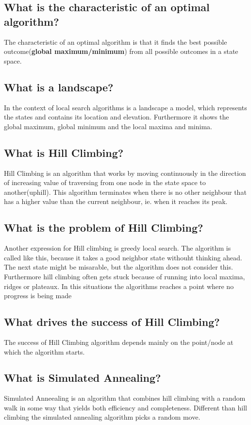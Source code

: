 \documentclass[11pt]{article}
\begin{document}
\subsection{What is the characteristic of an optimal algorithm?}
The characteristic of an optimal algorithm is that it finds the best possible outcome(\textbf{global maximum/minimum}) from all possible outcomes in a state space.

\subsection{What is a landscape?}
In the context of local search algorithms is a landscape a model, which represents the states and contains its location and elevation. Furthermore it shows the global maximum, global minimum and the local maxima and minima. 

\subsection{What is Hill Climbing?}
Hill Climbing is an algorithm that works by moving continuously in the direction of increasing value of traversing from one node in the state space to another(uphill). This algorithm terminates when there is no other neighbour that has a higher value than the current neighbour, ie. when it reaches its peak.

\subsection{What is the problem of Hill Climbing?}
Another expression for Hill climbing is greedy local search. The algorithm is called like this, because it takes a good neighbor state withouht thinking ahead. The next state might be misarable, but the algorithm does not consider this. Furthermore hill climbing often gets stuck because of running into local maxima, ridges or plateaux. In this situations the algorithms reaches a point where no progress is being made 

\subsection{What drives the success of Hill Climbing?}
The success of Hill Climbing algorithm depends mainly on the point/node at which the algorithm starts.

\subsection{What is Simulated Annealing?}
Simulated Anneealing is an algorithm that combines hill climbing with a random walk in some way that yields both efficiency and completeness. Different than hill climbing the simulated annealing algorithm picks a random move.
\end{document}
